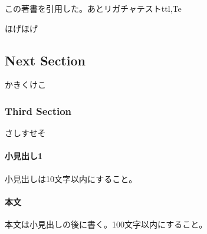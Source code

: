 \documentclass{jsarticle}
\begin{document}
    この著書\cite{latex}を引用した。あとリガチャテストttl,Te

    \begin{thebibliography}{9}
         ほげほげ
    \end{thebibliography}


    \subsection{Next Section}
    かきくけこ

    \subsubsection{Third Section}
    さしすせそ


    \paragraph{小見出し1} 小見出しは10文字以内にすること。
    \paragraph{本文} 本文は小見出しの後に書く。100文字以内にすること。

\end{document}

